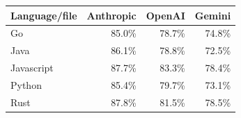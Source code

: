 \begin{tabular}{lrrr}
\toprule
Language/file & Anthropic & OpenAI & Gemini \\
\midrule
Go & 85.0\% & 78.7\% & 74.8\% \\
Java & 86.1\% & 78.8\% & 72.5\% \\
Javascript & 87.7\% & 83.3\% & 78.4\% \\
Python & 85.4\% & 79.7\% & 73.1\% \\
Rust & 87.8\% & 81.5\% & 78.5\% \\
\bottomrule
\end{tabular}
